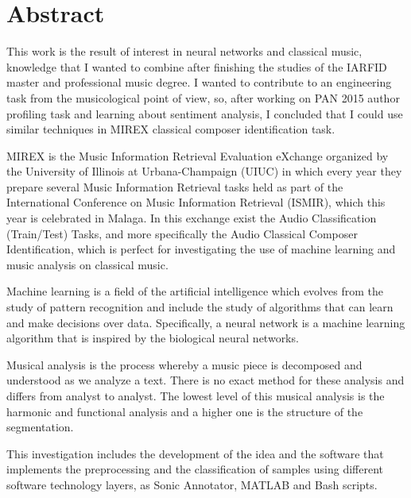 \documentclass[a4paper,openany,oneside,12pt]{book}
\begin{document}
\chapter*{Abstract}

This work is the result of interest in neural networks and classical music, knowledge that I wanted to combine after finishing the studies of the IARFID master and professional music degree. I wanted to contribute to an engineering task from the musicological point of view, so, after working on PAN 2015 author profiling task and learning about sentiment analysis, I concluded that I could use similar techniques in MIREX classical composer identification task.

MIREX is the Music Information Retrieval Evaluation eXchange organized by the University of Illinois at Urbana-Champaign (UIUC) in which every year they prepare several Music Information Retrieval tasks held as part of the International Conference on Music Information Retrieval (ISMIR), which this year is celebrated in Malaga. In this exchange exist the Audio Classification (Train/Test) Tasks, and more specifically the Audio Classical Composer Identification, which is perfect for investigating the use of machine learning and music analysis on classical music.

Machine learning is a field of the artificial intelligence which evolves from the study of pattern recognition and include the study of algorithms that can learn and make decisions over data. Specifically, a neural network is a machine learning algorithm that is inspired by the biological neural networks.

Musical analysis is the process whereby a music piece is decomposed and understood as we analyze a text. There is no exact method for these analysis and differs from analyst to analyst. The lowest level of this musical analysis is the harmonic and functional analysis and a higher one is the structure of the segmentation.

This investigation includes the development of the idea and the software that implements the preprocessing and the classification of samples using different software technology layers, as Sonic Annotator, MATLAB and Bash scripts.


\newpage
\thispagestyle{empty}
\mbox{}



\tableofcontents

\cleardoublepage
{}
\listoffigures
\end{document}
